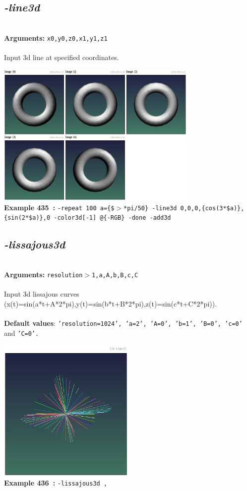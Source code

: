\documentclass[a4paper,11pt,twoside]{book}
\begin{document}
\subsection{\emph{-line3d} }\vspace*{-0.5em}
~\\\textbf{Arguments: } 
{\small \texttt{x0,y0,z0,x1,y1,z1}}\\~\\
Input 3d line at specified coordinates.
\begin{center}\includegraphics[keepaspectratio=true,height=7cm,width=\textwidth]{img/gmic_def435.jpg}\\
{\footnotesize \textbf{Example 435~:} \texttt{-repeat 100 a=\{\$$>$*pi/50\} -line3d 0,0,0,\{cos(3*\$a)\},\{sin(2*\$a)\},0 -color3d[-1] @\{-RGB\} -done -add3d}}
\end{center}

\subsection{\emph{-lissajous3d} }\vspace*{-0.5em}
~\\\textbf{Arguments: } 
{\small \texttt{resolution$>$1,a,A,b,B,c,C}}\\~\\
Input 3d lissajous curves (x(t)=sin(a*t+A*2*pi),y(t)=sin(b*t+B*2*pi),z(t)=sin(c*t+C*2*pi)).
~\\~\\\textbf{Default values}: {\small \texttt{'resolution=1024', 'a=2', 'A=0', 'b=1', 'B=0', 'c=0'} and \texttt{'C=0'.}}
\begin{center}\includegraphics[keepaspectratio=true,height=7cm,width=\textwidth]{img/gmic_def436.jpg}\\
{\footnotesize \textbf{Example 436~:} \texttt{-lissajous3d ,}}
\end{center}
\end{document}
